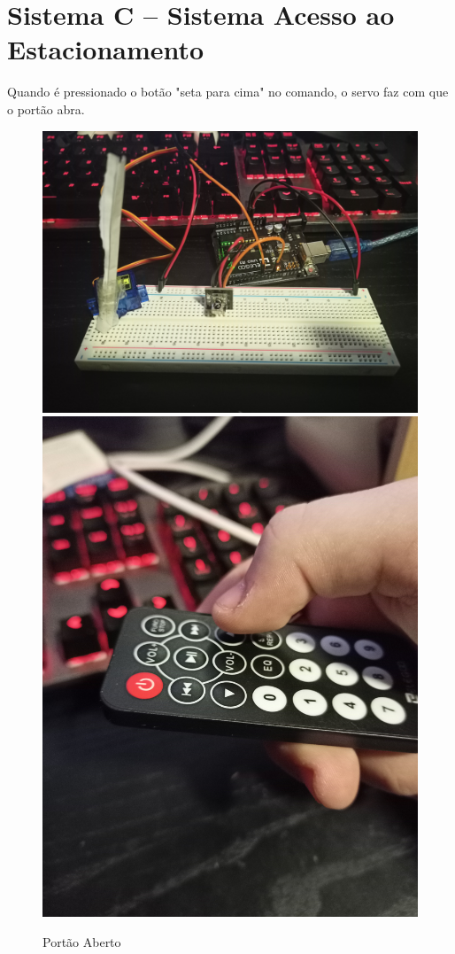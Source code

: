 \section{Sistema C – Sistema Acesso ao Estacionamento}


Quando é pressionado o botão "seta para cima" no comando, o servo faz com que o portão abra.

\begin{figure}[H]
    \centering
    \includegraphics[scale=0.03]{images/testes/sisC_Open.jpg}
    \includegraphics[scale=0.0225]{images/testes/ControllerUp.jpg}
    \caption{Portão Aberto}
\end{figure}


